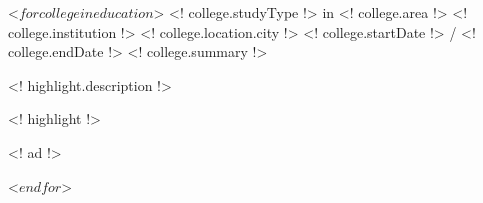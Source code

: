 \begin{cventries}
 <$ for college in education $>
  \cventry
    {<! college.studyType !> in <! college.area !>}
    {<! college.institution !>}
    {<! college.location.city !>}
    {<! college.startDate !> / <! college.endDate !>}
    {<! college.summary !>}
    {
          \begin{cvitems}
                    \item{<! highlight.description !>}
                    \item{<! highlight !>}
                    \begin{cvitemssub}
                        \item{<! ad !>}
                    \end{cvitemssub}
          \end{cvitems}
    }
 <$ endfor $>
\end{cventries}
